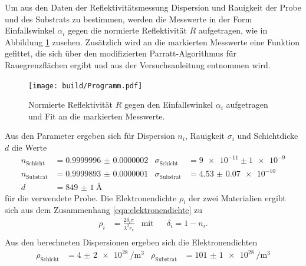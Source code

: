 Um aus den Daten der Reflektivitätsmessung Dispersion und Rauigkeit
der Probe und des Substrats zu bestimmen, werden die Messwerte in der Form
Einfallswinkel $\alpha_i$ gegen die
normierte Reflektivität $R$ aufgetragen, wie in Abbildung \ref{fig:messung}
zusehen. Zusätzlich wird an die markierten Messwerte
eine Funktion gefittet, die
sich über den
modifizierten Parratt-Algorithmus für Rauegrenzflächen ergibt und
aus der Versuchsanleitung \cite{sample} entnommen wird.




\begin{figure}
 \centering
   \texttt{[image: build/Programm.pdf]}
   \caption{Normierte Reflektivität $R$ gegen den Einfallswinkel $\alpha_i$ aufgetragen und Fit an die markierten Messwerte.}
   \label{fig:messung}
\end{figure}

Aus den Parameter ergeben sich für Dispersion $n_i$, Rauigkeit $\sigma_i$ und Schichtdicke $d$ die Werte
\begin{align}
  n_{\mathrm{Schicht}}&= \num{0.9999996(2)}  & \sigma_{\mathrm{Schicht}}&= \num{9e-11} \pm \num{1e-9} \\
  n_{\mathrm{Substrat}}&= \num{0.9999893(1)} & \sigma_{\mathrm{Substrat}}&= \SI{4.53(7)e-10}{}\\ %
  d& =\SI{849(1)}{\angstrom} 
\end{align}
für die verwendete Probe.
Die Elektronendichte $\rho_i$ der zwei Materialien ergibt sich aus dem Zusammenhang \eqref{eqn:elektronendichte} zu
\begin{align}
\rho_i&=\frac{2\delta_i \pi}{\lambda^2 r_e} &\text{mit}&  &\delta_i = 1 - n_i.\\
\end{align}
Aus den berechneten Dispersionen ergeben sich die Elektronendichten
\begin{align}
\rho_{\mathrm{Schicht}}&=\SI{4(2)e28}{\per\cubic\meter}  & \rho_{\mathrm{Substrat}}&=\SI{101(1)e28}{\per\cubic\meter}
\end{align}
